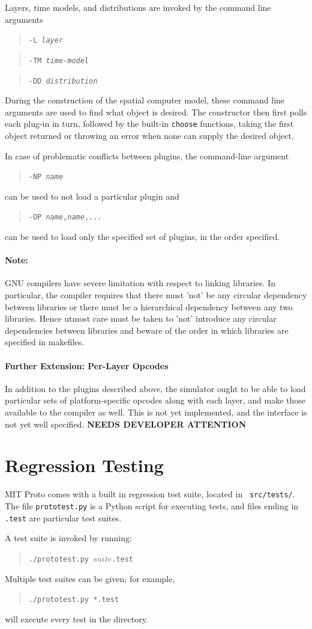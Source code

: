 \documentclass{article}
\newcommand\fixme{{\bf NEEDS DEVELOPER ATTENTION}}
\newcommand\code[1]{\begin{quote}\var{#1}\end{quote}}
\newcommand\var[1]{{\tt #1}}
\begin{document}
Layers, time models, and distributions are invoked by the command line
arguments \code{-L {\it layer}} \code{-TM {\it time-model}} \code{-DD
  {\it distribution}}  

During the construction of the spatial computer model, these command
line arguments are used to find what object is desired.  The
constructor then first polls each plug-in in turn, followed by the
built-in \var{choose} functions, taking the first object returned or
throwing an error when none can supply the desired object.

In case of problematic conflicts between plugins, the command-line
argument \code{-NP {\it name}} can be used to not load a particular
plugin and \code{-OP {\it name},{\it name},...} can be used to load
only the specified set of plugins, in the order specified.

\paragraph{Note:}
GNU compilers have severe limitation with respect to linking libraries. 
In particular, the compiler requires that there must 'not' be any circular dependency 
between libraries or there must be a hierarchical dependency between any two libraries.
Hence utmost care must be taken to 'not' introduce any circular dependencies between libraries
and beware of the order in which libraries are specified in makefiles.

\paragraph{Further Extension: Per-Layer Opcodes}

In addition to the plugins described above, the simulator ought to be
able to load particular sets of platform-specific opcodes along with
each layer, and make those available to the compiler as well.  This
is not yet implemented, and the interface is not yet well specified.
\fixme{}


\section{Regression Testing}

MIT Proto comes with a built in regression test suite, located in {\tt
  src/tests/}.  The file {\tt prototest.py} is a Python script for
executing tests, and files ending in {\tt .test} are particular test suites.

A test suite is invoked by running: \code{./prototest.py $suite$.test}
Multiple test suites can be given; for example, \code{./prototest.py
  *.test} will execute every test in the directory.
\end{document}
